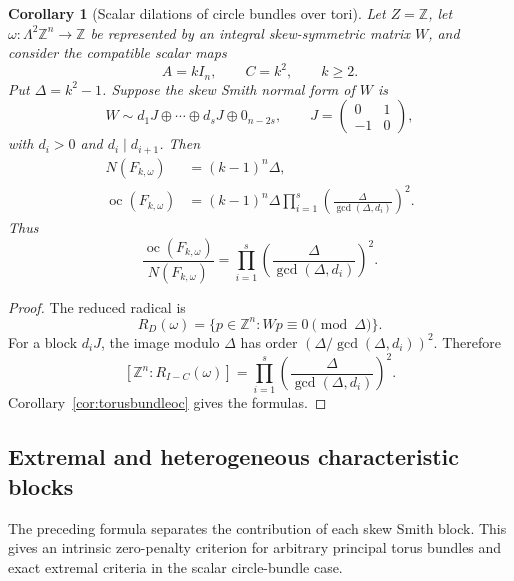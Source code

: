 \documentclass[11pt]{article}
\newtheorem{corollary}[theorem]{Corollary}
\DeclareMathOperator{\oc}{oc}
\newcommand{\Z}{\mathbb Z}
\begin{document}
\begin{corollary}[Scalar dilations of circle bundles over tori]
\label{cor:circlebundleformula}
Let $Z=\Z$, let $\omega\colon\Lambda^2\Z^n\to\Z$ be represented by an
integral skew-symmetric matrix $W$, and consider the compatible scalar maps
\[
  A=kI_n,
  \qquad
  C=k^2,
  \qquad k\ge2.
\]
Put $\Delta=k^2-1$.  Suppose the skew Smith normal form of $W$ is
\[
  W\sim d_1J\oplus\cdots\oplus d_sJ\oplus0_{n-2s},
  \qquad
  J=\begin{pmatrix}0&1\\-1&0\end{pmatrix},
\]
with $d_i>0$ and $d_i\mid d_{i+1}$.  Then
\begin{align}
  N(F_{k,\omega})
  &=(k-1)^n\Delta,
  \label{eq:circlebundleN}\\
  \oc(F_{k,\omega})
  &=(k-1)^n\Delta
  \prod_{i=1}^s
  \left(\frac{\Delta}{\gcd(\Delta,d_i)}\right)^2.
  \label{eq:circlebundleoc}
\end{align}
Thus
\[
  \boxed{
  \frac{\oc(F_{k,\omega})}{N(F_{k,\omega})}
  =\prod_{i=1}^s
  \left(\frac{\Delta}{\gcd(\Delta,d_i)}\right)^2.}
\]
\end{corollary}

\begin{proof}
The reduced radical is
\[
  R_D(\omega)
  =\{p\in\Z^n:Wp\equiv0\pmod\Delta\}.
\]
For a block $d_iJ$, the image modulo $\Delta$ has order
$(\Delta/\gcd(\Delta,d_i))^2$.  Therefore
\[
  [\Z^n:R_{I-C}(\omega)]
  =\prod_{i=1}^s
  \left(\frac{\Delta}{\gcd(\Delta,d_i)}\right)^2.
\]
Corollary~\ref{cor:torusbundleoc} gives the formulas.
\end{proof}

\subsection{Extremal and heterogeneous characteristic blocks}
\label{subsec:extremalblocks}

The preceding formula separates the contribution of each skew Smith block.
This gives an intrinsic zero-penalty criterion for arbitrary principal torus
bundles and exact extremal criteria in the scalar circle-bundle case.
\end{document}
